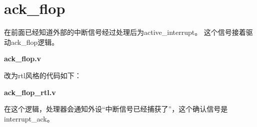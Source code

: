 \section{ack\_flop}

在前面已经知道外部的中断信号经过处理后为active\_interrupt。
这个信号接着驱动ack\_flop逻辑。

\textbf{ack\_flop.v}


改为rtl风格的代码如下：

\textbf{ack\_flop\_rtl.v}


在这个逻辑，处理器会通知外设“中断信号已经捕获了”，这个确认信号是
interrupt\_ack。

